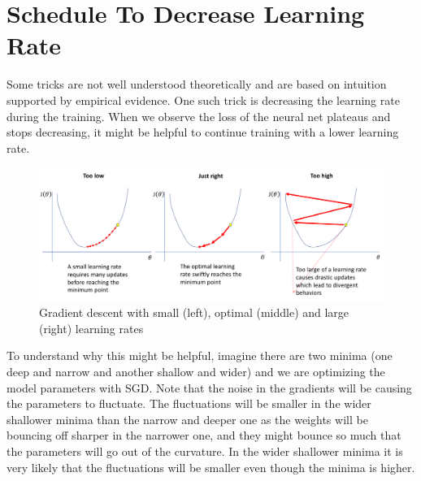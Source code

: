 {\centering{}\par}

\section{Schedule To Decrease Learning Rate}
Some tricks are not well understood theoretically and are based on intuition supported by empirical evidence. 
One such trick is decreasing the learning rate during the training. 
When we observe the loss of the neural net plateaus and stops decreasing, it might be helpful to continue training with a lower learning rate. 

\begin{figure}[hbt!]
\centering
\includegraphics[width=120mm]{figs/Learning rate_3.png}
\caption{Gradient descent with small (left), optimal (middle) and large (right) learning rates}
\label{fig:learningrate1}
\end{figure}

To understand why this might be helpful, imagine there are two minima (one deep and narrow and another shallow and wider) and we are optimizing the model parameters with SGD.
Note that the noise in the gradients will be causing the parameters to fluctuate. 
The fluctuations will be smaller in the wider shallower minima than the narrow and deeper one as the weights will be bouncing off sharper in the narrower one, and they might bounce so much that the parameters will go out of the curvature. 
In the wider shallower minima it is very likely that the fluctuations will be smaller even though the minima is higher.

